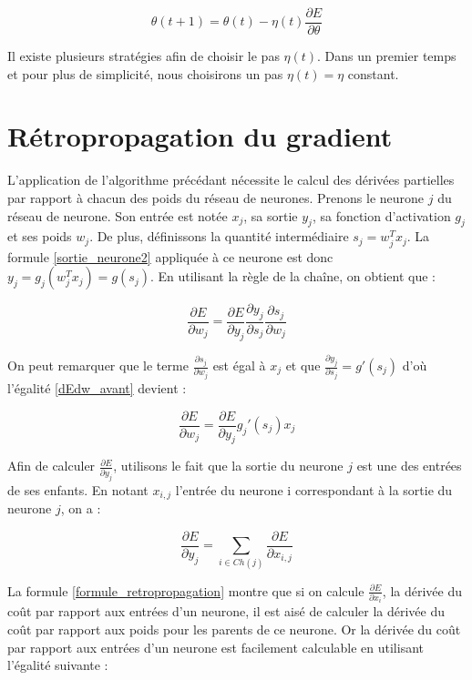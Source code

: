 \begin{equation}
\theta(t+1) = \theta(t) - \eta(t) \frac{\partial E}{\partial \theta}
\label{mise_a_jour_poids}
\end{equation}

Il existe plusieurs stratégies afin de choisir le pas $\eta(t)$. Dans un premier temps et pour plus de simplicité, nous choisirons un pas $\eta(t)=\eta$ constant.

\section{Rétropropagation du gradient}

L'application de l'algorithme précédant nécessite le calcul des dérivées partielles par rapport à chacun des poids du réseau de neurones. Prenons le neurone $j$ du réseau de neurone. Son entrée est notée $x_j$, sa sortie $y_j$, sa fonction d'activation $g_j$ et ses poids $w_j$. De plus, définissons la quantité intermédiaire $s_j = w_j^Tx_j$. La formule \ref{sortie_neurone2} appliquée à ce neurone est donc $y_j = g_j(w_j^Tx_j) = g(s_j)$. En utilisant la règle de la chaîne, on obtient que :

\begin{equation}
\frac{\partial E}{\partial w_j} = \frac{\partial E}{\partial y_j}\frac{\partial y_j}{\partial s_j}\frac{\partial s_j}{\partial w_j}
\label{dEdw_avant}
\end{equation}

On peut remarquer que le terme $\frac{\partial s_j}{\partial w_j}$ est égal à $x_j$ et que $\frac{\partial y_j}{\partial s_j} = g'(s_j)$ d'où l'égalité \ref{dEdw_avant} devient :

\begin{equation}
\frac{\partial E}{\partial w_j} = \frac{\partial E}{\partial y_j} g_j'(s_j) x_j
\label{dEdw}
\end{equation}

Afin de calculer $\frac{\partial E}{\partial y_j}$, utilisons le fait que la sortie du neurone $j$ est une des entrées de ses enfants. En notant $x_{i, j}$ l'entrée du neurone i correspondant à la sortie du neurone $j$, on a :

\begin{equation}
\frac{\partial E}{\partial y_j} = \sum_{i \in Ch(j)}{\frac{\partial E}{\partial x_{i,j}}}
\label{formule_retropropagation}
\end{equation}

La formule \ref{formule_retropropagation} montre que si on calcule $\frac{\partial E}{\partial x_i}$, la dérivée du coût par rapport aux entrées d'un neurone, il est aisé de calculer la dérivée du coût par rapport aux poids pour les parents de ce neurone. Or la dérivée du coût par rapport aux entrées d'un neurone est facilement calculable en utilisant l'égalité suivante :

